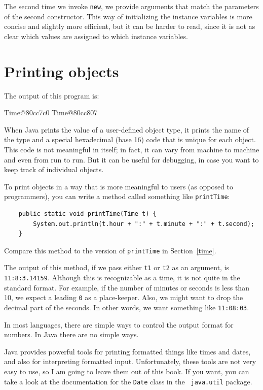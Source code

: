 \documentclass[12pt]{book}
\theoremstyle{exercise}
\begin{document}
The second time we invoke {\tt new}, we provide
arguments that match the parameters of the second constructor.
This way of initializing the instance variables is more concise
and slightly more efficient, but it can be harder to read, since
it is not as clear which values are assigned to which instance
variables.


\section{Printing objects}
\label{printobject}

The output of this program is:

\begin{verbatimtab}
Time@80cc7c0
Time@80cc807
\end{verbatimtab}
%
When Java prints the value of a user-defined object type, it prints
the name of the type and a special hexadecimal (base 16) code that is
unique for each object.  This code is not meaningful in itself; in
fact, it can vary from machine to machine and even from run to run.
But it can be useful for debugging, in case you want to keep track of
individual objects.

To print objects in a way that is more meaningful to users
(as opposed to programmers), you can write a method
called something like {\tt printTime}:

\begin{lstlisting}
    public static void printTime(Time t) {
        System.out.println(t.hour + ":" + t.minute + ":" + t.second);
    }
\end{lstlisting}
%
Compare this method to the version of {\tt printTime} in
Section~\ref{time}.

The output of this method, if we pass either {\tt t1} or {\tt t2} as
an argument, is {\tt 11:8:3.14159}.  Although this is recognizable
as a time, it is not quite in the standard format.  For example, if
the number of minutes or seconds is less than 10, we expect a leading
{\tt 0} as a place-keeper.  Also, we might want to drop the decimal
part of the seconds.  In other words, we want something like
{\tt 11:08:03}.

In most languages, there are simple ways to control the output format
for numbers.  In Java there are no simple ways.

Java provides powerful tools for printing formatted things
like times and dates, and also for interpreting formatted input.
Unfortunately, these tools are not very easy to use, so I am going to
leave them out of this book.  If you want, you can take a look
at the documentation for the {\tt Date} class in the {\tt
java.util} package.
\end{document}
